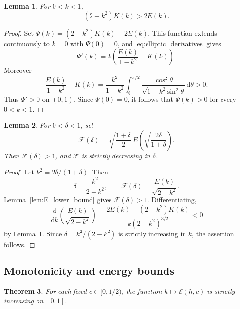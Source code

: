 \documentclass[a4paper,11pt]{amsart}
\numberwithin{equation}{section}
\theoremstyle{plain}
\newtheorem{thm}{Theorem}[section]
\newtheorem{lem}[thm]{Lemma}
\newcommand{\dif}{\mathrm{d}}
\begin{document}
\begin{lem}\label{lem:elliptic_inequality}
For $0<k<1$,
\[
    (2-k^2)K(k)>2E(k).
\]
\end{lem}

\begin{proof}
Set $\Psi(k)=(2-k^2)K(k)-2E(k)$. This function extends
continuously to $k=0$ with $\Psi(0)=0$, and
\eqref{eq:elliptic_derivatives} gives
\[
    \Psi'(k)=k\left(\frac{E(k)}{1-k^2}-K(k)\right).
\]
Moreover
\[
    \frac{E(k)}{1-k^2}-K(k)
    =\frac{k^2}{1-k^2}
      \int_0^{\pi/2}\frac{\cos^2\theta}{\sqrt{1-k^2\sin^2\theta}}\,\dif\theta
    >0.
\]
Thus $\Psi'>0$ on $(0,1)$. Since $\Psi(0)=0$, it follows that
$\Psi(k)>0$ for every $0<k<1$.
\end{proof}

\begin{lem}\label{lem:boundary_function}
For $0<\delta<1$, set
\begin{equation}\label{eq:boundary_function_definition}
    \mathcal F(\delta)
    =\sqrt{\frac{1+\delta}{2}}\,
     E\left(\sqrt{\frac{2\delta}{1+\delta}}\right).
\end{equation}
Then $\mathcal F(\delta)>1$, and $\mathcal F$ is strictly decreasing in $\delta$.
\end{lem}

\begin{proof}
Let $k^2=2\delta/(1+\delta)$. Then
\[
    \delta=\frac{k^2}{2-k^2},
    \qquad
    \mathcal F(\delta)=\frac{E(k)}{\sqrt{2-k^2}}.
\]
Lemma~\ref{lem:E_lower_bound} gives $\mathcal F(\delta)>1$.  Differentiating,
\[
    \frac{\dif}{\dif k}\left(\frac{E(k)}{\sqrt{2-k^2}}\right)
    =\frac{2E(k)-(2-k^2)K(k)}{k(2-k^2)^{3/2}}<0
\]
by Lemma~\ref{lem:elliptic_inequality}. Since $\delta=k^2/(2-k^2)$ is
strictly increasing in $k$, the assertion follows.
\end{proof}

\subsection{Monotonicity and energy bounds}

\begin{thm}\label{thm:E_monotonic_h}
For each fixed $c\in[0,1/2)$, the function
$h\mapsto \mathcal E(h,c)$ is strictly increasing on $[0,1]$.
\end{thm}
\end{document}
